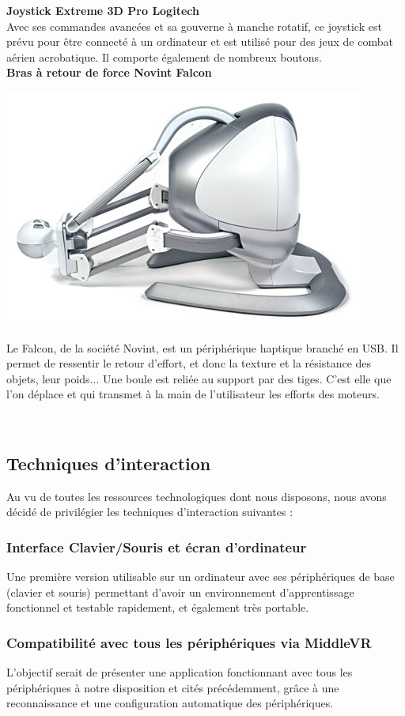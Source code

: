 \textbf{Joystick Extreme 3D Pro Logitech}
\\

Avec ses commandes avancées et sa gouverne à manche rotatif, ce joystick est prévu pour être connecté à un ordinateur et est utilisé pour des jeux de combat aérien acrobatique. Il comporte également de nombreux boutons.
\\

\textbf{Bras à retour de force Novint Falcon}
\\
\noindent\begin{minipage}{0.3\textwidth}
			\includegraphics[width=\linewidth]{1-PreEtude/img/falcon}
			\end{minipage}
			\hfill
			\begin{minipage}{0.65\textwidth}
Le Falcon, de la société Novint, est un périphérique haptique branché en USB. Il permet de ressentir le retour d'effort, et donc la texture et la résistance des objets, leur poids... Une boule est reliée au support par des tiges. C'est elle que l'on déplace et qui transmet à la main de l'utilisateur les efforts des moteurs.
		\end{minipage}
\\

\subsection{Techniques d'interaction}
Au vu de toutes les ressources technologiques dont nous disposons, nous avons décidé de privilégier les techniques d'interaction suivantes :

\subsubsection{Interface Clavier/Souris et écran d'ordinateur}
Une première version utilisable sur un ordinateur avec ses périphériques de base (clavier et souris) permettant d'avoir un environnement d'apprentissage fonctionnel et testable rapidement, et également très portable.

\subsubsection{Compatibilité avec tous les périphériques via MiddleVR}
L'objectif serait de présenter une application fonctionnant avec tous les périphériques à notre disposition et cités précédemment, grâce à une reconnaissance et une configuration automatique des périphériques.
\\

